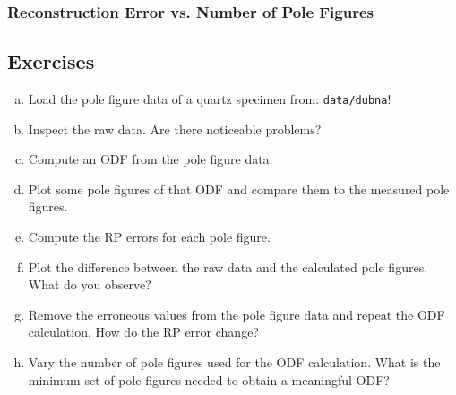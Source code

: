 \begin{frame}
  \frametitle{Reconstruction Error vs. Number of Pole Figures}


\end{frame}

\subsection*{Exercises}

\begin{frame}

  \begin{Exercise}
    \begin{enumerate}[a)]
    \item Load the pole figure data of a quartz specimen from:
      \texttt{data/dubna}!
    \item Inspect the raw data. Are there noticeable problems?
    \item Compute an ODF from the pole figure data.
    \item Plot some pole figures of that ODF and compare them to the measured
      pole figures.
    \item Compute the RP errors for each pole figure.
    \item Plot the difference between the raw data and the calculated pole
      figures. What do you observe?
    \item Remove the erroneous values from the pole figure data and repeat the
      ODF calculation. How do the RP error change?
    \item Vary the number of pole figures used for the ODF calculation. What
      is the minimum set of pole figures needed to obtain a meaningful ODF?
    \end{enumerate}
  \end{Exercise}

\end{frame}


